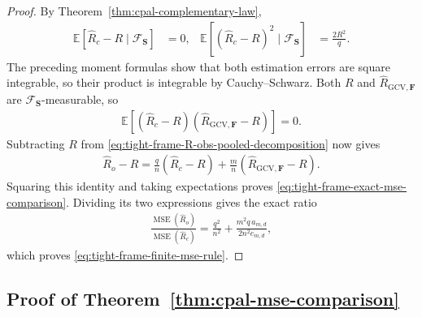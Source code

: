 \documentclass{article}
\theoremstyle{plain}
\theoremstyle{definition}
\theoremstyle{definition}
\def\E{{\mathbb{E}}}
\def\mathbold{\boldsymbol}
\def\cal{\mathcal}
\def\bF{\mathbold{F}}\def\calF{{\cal F}}\def\scrF{{\mathscr F}}\def\Fhat{\widehat{F}}\def\Ftil{{\widetilde F}}
\def\bS{\mathbold{S}}\def\hbS{{\widehat{\bS}}}\def\tbS{{\widetilde{\bS}}}
\newcommand{\GCV}{{\text{GCV}}}
\newcommand{\hR}{\hat{R}}
\begin{document}
\begin{proof}
By Theorem~\ref{thm:cpal-complementary-law},
\begin{align*}
    \E[\widehat R_c-R\mid\calF_{\bS}]&=0,
    &\E[(\widehat R_c-R)^2\mid\calF_{\bS}]
       &=\frac{2R^2}{q}.
\end{align*}
The preceding moment formulas show that both estimation errors are square
integrable, so their product is integrable by Cauchy--Schwarz.
Both $R$ and $\hR_{\GCV,\bF}$ are $\calF_{\bS}$-measurable, so
\begin{align*}
    \E[(\widehat R_c-R)(\hR_{\GCV,\bF}-R)]=0.
\end{align*}
Subtracting $R$ from
\eqref{eq:tight-frame-R-obs-pooled-decomposition} now gives
\begin{align*}
    \hR_o-R
    =\frac qn(\widehat R_c-R)
      +\frac mn(\hR_{\GCV,\bF}-R).
\end{align*}
Squaring this identity and taking expectations proves
\eqref{eq:tight-frame-exact-mse-comparison}. Dividing its two expressions
gives the exact ratio
\begin{align*}
    \frac{\operatorname{MSE}(\hR_o)}
         {\operatorname{MSE}(\widehat R_c)}
    =\frac{q^2}{n^2}+\frac{m^2q\,a_{m,d}}{2n^2e_{m,d}},
\end{align*}
which proves \eqref{eq:tight-frame-finite-mse-rule}.
\end{proof}

\subsection{Proof of Theorem~\ref{thm:cpal-mse-comparison}}
\label{app:proof-tight-frame-asymptotic-mse-threshold}
\end{document}
